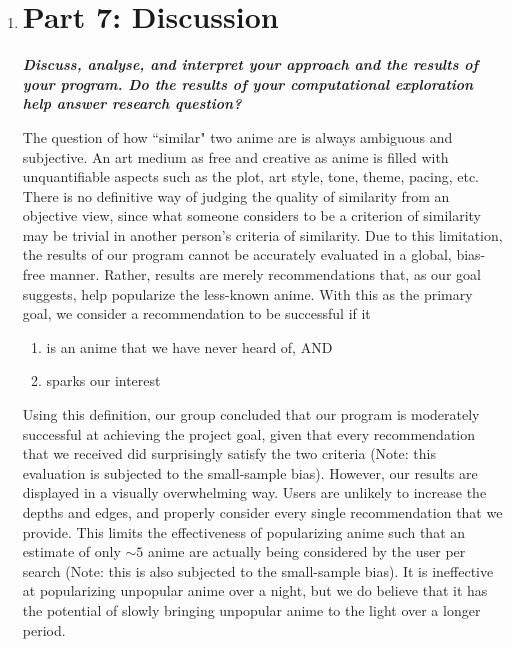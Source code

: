 \documentclass[12pt]{article}
\begin{document}
\begin{enumerate}
\item \section*{Part 7: Discussion}

\begin{text}

\textbf{\emph{Discuss, analyse, and interpret your approach and the results of your program. Do the results of your computational exploration help answer research question?}}

The question of how ``similar" two anime are is always ambiguous and subjective. An art medium as free and creative as anime is filled with unquantifiable aspects such as the plot, art style, tone, theme, pacing, etc. There is no definitive way of judging the quality of similarity from an objective view, since what someone considers to be a criterion of similarity may be trivial in another person's criteria of similarity. Due to this limitation, the results of our program cannot be accurately evaluated in a global, bias-free manner. Rather, results are merely recommendations that, as our goal suggests, help popularize the less-known anime. With this as the primary goal, we consider a recommendation to be successful if it
\begin{enumerate}
    \item is an anime that we have never heard of, AND
    \item sparks our interest
\end{enumerate}
Using this definition, our group concluded that our program is moderately successful at achieving the project goal, given that every recommendation that we received did surprisingly satisfy the two criteria (Note: this evaluation is subjected to the small-sample bias). However, our results are displayed in a visually overwhelming way. Users are unlikely to increase the depths and edges, and properly consider every single recommendation that we provide. This limits the effectiveness of popularizing anime such that an estimate of only $\sim5$ anime are actually being considered by the user per search (Note: this is also subjected to the small-sample bias). It is ineffective at popularizing unpopular anime over a night, but we do believe that it has the potential of slowly bringing unpopular anime to the light over a longer period.


\end{text}
\end{enumerate}
\end{document}

